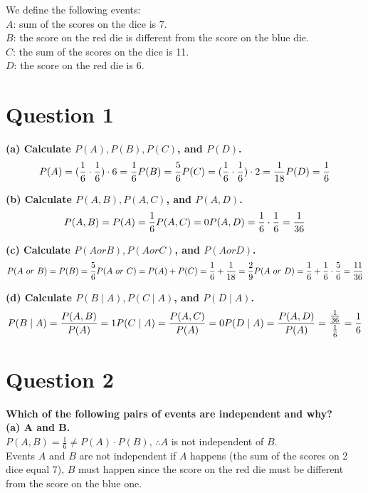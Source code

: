\documentclass[
]{book}
\begin{document}
We define the following events:\\
\(A\): sum of the scores on the dice is 7.\\
\(B\): the score on the red die is different from the score on the blue die.\\
\(C\): the sum of the scores on the dice is 11.\\
\(D\): the score on the red die is 6.\\

\section{Question 1}\label{question-1-1}

\textbf{(a) Calculate \(P(A), P(B), P(C)\), and \(P(D)\).}
\[P(A) = (\frac{1}{6} \cdot \frac{1}{6}) \cdot 6 = \frac{1}{6} \\
P(B) = \frac{5}{6} \\
P(C) = (\frac{1}{6} \cdot \frac{1}{6}) \cdot 2 = \frac{1}{18} \\
P(D) = \frac{1}{6}\]

\textbf{(b) Calculate \(P(A,B), P(A,C)\), and \(P(A,D)\).}
\[P(A,B) = P(A) = \frac{1}{6} \\
P(A,C) = 0 \\
P(A,D) = \frac{1}{6} \cdot \frac{1}{6} = \frac{1}{36}\]

\textbf{(c) Calculate \(P(A or B), P(A or C)\), and \(P(A or D)\).}
\[P(A \ or \ B) = P(B) = \frac{5}{6} \\
P(A \ or \  C) = P(A) + P(C) = \frac{1}{6} + \frac{1}{18} = \frac{2}{9} \\
P(A \ or \ D) = \frac{1}{6} + \frac{1}{6} \cdot \frac{5}{6} = \frac{11}{36}\]

\textbf{(d) Calculate \(P(B \mid A), P(C \mid A)\), and \(P(D \mid A)\).}
\[P(B \mid A) = \frac{P(A,B)}{P(A)} = 1 \\
P(C \mid A) = \frac{P(A,C)}{P(A)} = 0 \\
P(D \mid A) = \frac{P(A,D)}{P(A)} = \frac{\frac{1}{36}}{\frac{1}{6}} = \frac{1}{6}\]

\section{Question 2}\label{question-2-1}

\textbf{Which of the following pairs of events are independent and why?}\\
\textbf{(a) A and B.}\\
\(P(A,B) = \frac{1}{6} \neq P(A) \cdot P(B)\), \(\therefore A\) is not independent of \(B\).\\
Events \(A\) and \(B\) are not independent if \(A\) happens (the sum of the scores on 2 dice equal 7), \(B\) must happen since the score on the red die must be different from the score on the blue one.\\
\end{document}
